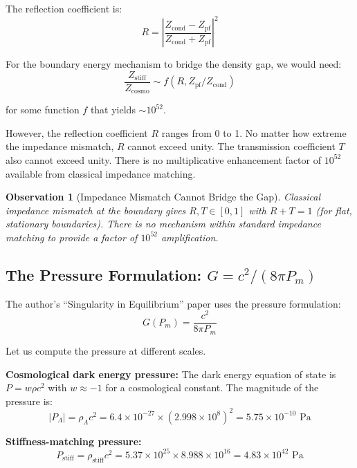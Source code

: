 \documentclass[11pt,a4paper]{article}
\newcommand{\ee}[1]{\times 10^{#1}}
\newcommand{\rhostiff}{\ensuremath{\rho_{\mathrm{stiff}}}}
\newtheorem{observation}{Observation}
\theoremstyle{definition}
\begin{document}
The reflection coefficient is:
\begin{equation}
R = \left| \frac{Z_{\mathrm{cond}} - Z_{\mathrm{pf}}}{Z_{\mathrm{cond}} + Z_{\mathrm{pf}}} \right|^2
\end{equation}

For the boundary energy mechanism to bridge the density gap, we would need:
\begin{equation}
\frac{Z_{\mathrm{stiff}}}{Z_{\mathrm{cosmo}}} \sim f(R, Z_{\mathrm{pf}}/Z_{\mathrm{cond}})
\end{equation}

for some function $f$ that yields $\sim 10^{52}$.

However, the reflection coefficient $R$ ranges from 0 to 1. No matter how extreme the impedance mismatch, $R$ cannot exceed unity. The transmission coefficient $T$ also cannot exceed unity. There is no multiplicative enhancement factor of $10^{52}$ available from classical impedance matching.

\begin{observation}[Impedance Mismatch Cannot Bridge the Gap]
Classical impedance mismatch at the boundary gives $R, T \in [0,1]$ with $R + T = 1$ (for flat, stationary boundaries). There is no mechanism within standard impedance matching to provide a factor of $10^{52}$ amplification.
\end{observation}

\subsection{The Pressure Formulation: $G = c^2/(8\pi P_m)$}
\label{sec:pressure_formulation}

The author's ``Singularity in Equilibrium'' paper uses the pressure formulation:
\begin{equation}
G(P_m) = \frac{c^2}{8\pi P_m}
\end{equation}

Let us compute the pressure at different scales.

\textbf{Cosmological dark energy pressure:}
The dark energy equation of state is $P = w \rho c^2$ with $w \approx -1$ for a cosmological constant. The magnitude of the pressure is:
\begin{equation}
|P_\Lambda| = \rho_\Lambda c^2 = 6.4 \ee{-27} \times (2.998 \ee{8})^2 = 5.75 \ee{-10} \text{ Pa}
\end{equation}

\textbf{Stiffness-matching pressure:}
\begin{equation}
P_{\mathrm{stiff}} = \rhostiff c^2 = 5.37 \ee{25} \times 8.988 \ee{16} = 4.83 \ee{42} \text{ Pa}
\end{equation}
\end{document}
